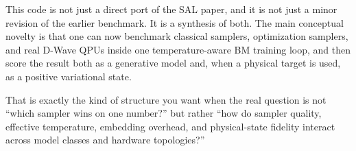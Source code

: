 \documentclass[11pt]{article}
\begin{document}
This code is not just a direct port of the SAL paper, and it is not just a
minor revision of the earlier benchmark. It is a synthesis of both. The main
conceptual novelty is that one can now benchmark classical samplers, optimization
samplers, and real D-Wave QPUs inside one temperature-aware BM training loop,
and then score the result both as a generative model and, when a physical target
is used, as a positive variational state.

That is exactly the kind of structure you want when the real question is not
``which sampler wins on one number?'' but rather ``how do sampler quality,
effective temperature, embedding overhead, and physical-state fidelity interact
across model classes and hardware topologies?''
\end{document}
